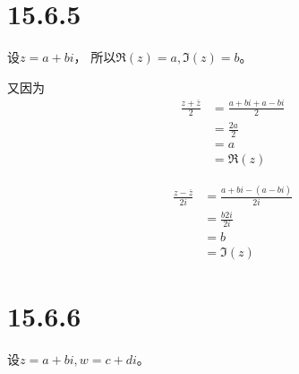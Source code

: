\documentclass{article}
\begin{document}
\section*{15.6.5}

设$z = a + bi$，
所以$\mathfrak{R} (z) = a, \mathfrak{I}(z) = b$。

又因为
\begin{align*}
  \frac{z + \overline{z}}{2} & = \frac{a + bi + a - bi}{2} \\
                             & = \frac{2a}{2}              \\
                             & = a                         \\
                             & = \mathfrak{R} (z)
\end{align*}

\begin{align*}
  \frac{z - \overline{z}}{2i} & = \frac{a + bi - (a - bi)}{2i} \\
                              & = \frac{b2i}{2i}               \\
                              & = b                            \\
                              & = \mathfrak{I}(z)
\end{align*}

\section*{15.6.6}

设$z = a + bi, w = c + di$。
\end{document}
